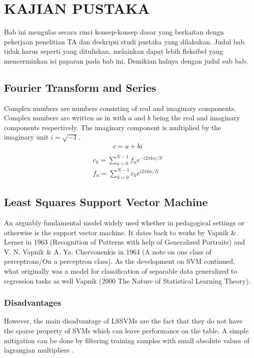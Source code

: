 \chapter{KAJIAN PUSTAKA}

\noindent Bab ini mengulas secara rinci konsep-konsep dasar yang berkaitan dengn pekerjaan penelitian TA dan deskripsi studi pustaka yang dilakukan. Judul bab tidak harus seperti yang dituliskan, melainkan dapat lebih fleksibel yang mencerminkan isi paparan pada bab ini. Demikian halnya dengan judul sub bab.

\section{Fourier Transform and Series}\label{sec:fourier_discussion}
\noindent

Complex numbers are numbers consisting of real and imaginary components. Complex numbers are written as in  with \(a \) and \(b \) being the real and imaginary components respectively. The imaginary component is multiplied by the imaginary unit \(i=\sqrt{-1}\).
\begin{align}
  c = a + bi \label{eq:complex_number} \\
\end{align}
\autocite{DiscreteFourierTransform}
\begin{align}
  c_k=\sum_{n=0}^{N-1} f_n e^{-i2\pi kn/N} \label{eq:discrete_fourier_transform} \\
  f_n=\sum_{k=0}^{N-1} c_k e^{i2\pi kn/N} \label{eq:inverse_discrete_fourier_transform}
\end{align}

\section{Least Squares Support Vector Machine}
\noindent An arguably fundamental model widely used whether in pedagogical settings or otherwise is the support vector machine. It dates back to works by Vapnik \& Lerner in 1963 (Recognition of Patterns with help of Generalized Portraits) and V. N. Vapnik \& A. Ya. Chervonenkis in 1964 (A note on one class of perceptrons/On a perceptron class). As the development on SVM continued, what originally was a model for classification of separable data generalized to regression tasks as well Vapnik (2000 The Nature of Statistical Learning Theory).
\subsection{Disadvantages}
However, the main disadvantage of LSSVMs are the fact that they do not have the sparse property of SVMs which can leave performance on the table. A simple mitigation can be done by filtering training samples with small absolute values of lagrangian multipliers \autocite{haifengwangComparisonSVMLSSVM2005}.


